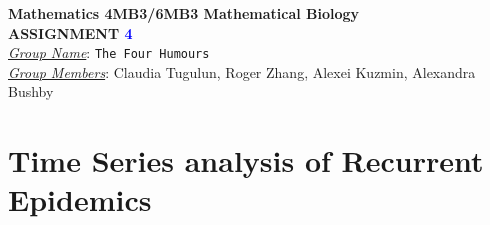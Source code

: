 \documentclass[12pt]{article}\usepackage[]{graphicx}\usepackage[]{color}
\begin{document}
\begin{center}
{\bf Mathematics 4MB3/6MB3 Mathematical Biology\\
 ASSIGNMENT \textcolor{blue}{4}}\\
\medskip
\underline{\emph{Group Name}}: \texttt{{\color{blue}The Four Humours}}\\
\medskip
\underline{\emph{Group Members}}: {\color{blue}Claudia Tugulun, Roger Zhang, Alexei Kuzmin, Alexandra Bushby}
\end{center}

\bigskip
\noindent


\bigskip

\section{Time Series analysis of Recurrent Epidemics}
\end{document}
